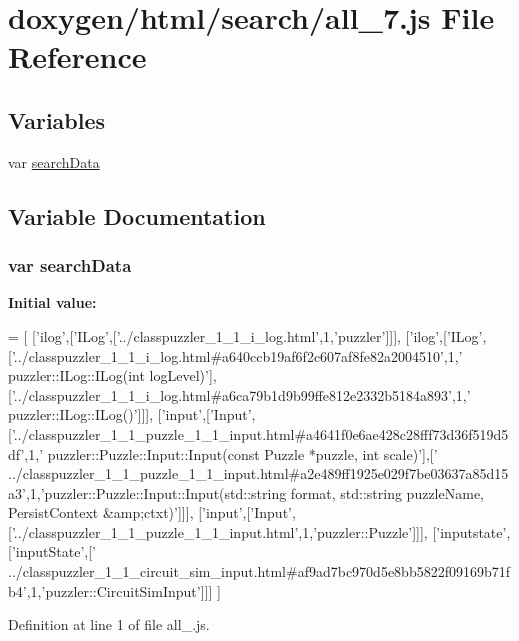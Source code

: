 \hypertarget{a00052}{}\section{doxygen/html/search/all\+\_\+7.js File Reference}
\label{a00052}
\subsection*{Variables}
\begin{DoxyCompactItemize}
\item 
var \hyperlink{a00052_ad01a7523f103d6242ef9b0451861231e}{search\+Data}
\end{DoxyCompactItemize}


\subsection{Variable Documentation}
\hypertarget{a00052_ad01a7523f103d6242ef9b0451861231e}{}
\subsubsection[{search\+Data}]{\setlength{\rightskip}{0pt plus 5cm}var search\+Data}\label{a00052_ad01a7523f103d6242ef9b0451861231e}
{\bfseries Initial value\+:}
\begin{DoxyCode}
=
[
  [\textcolor{stringliteral}{'ilog'},[\textcolor{stringliteral}{'ILog'},[\textcolor{stringliteral}{'../classpuzzler\_1\_1\_i\_log.html'},1,\textcolor{stringliteral}{'puzzler'}]]],
  [\textcolor{stringliteral}{'ilog'},[\textcolor{stringliteral}{'ILog'},[\textcolor{stringliteral}{'../classpuzzler\_1\_1\_i\_log.html#a640ccb19af6f2c607af8fe82a2004510'},1,\textcolor{stringliteral}{'
      puzzler::ILog::ILog(int logLevel)'}],[\textcolor{stringliteral}{'../classpuzzler\_1\_1\_i\_log.html#a6ca79b1d9b99ffe812e2332b5184a893'},1,\textcolor{stringliteral}{'
      puzzler::ILog::ILog()'}]]],
  [\textcolor{stringliteral}{'input'},[\textcolor{stringliteral}{'Input'},[\textcolor{stringliteral}{'../classpuzzler\_1\_1\_puzzle\_1\_1\_input.html#a4641f0e6ae428c28fff73d36f519d5df'},1,\textcolor{stringliteral}{'
      puzzler::Puzzle::Input::Input(const Puzzle *puzzle, int scale)'}],[\textcolor{stringliteral}{'
      ../classpuzzler\_1\_1\_puzzle\_1\_1\_input.html#a2e489ff1925e029f7be03637a85d15a3'},1,\textcolor{stringliteral}{'puzzler::Puzzle::Input::Input(std::string format, std::string puzzleName,
       PersistContext &amp;ctxt)'}]]],
  [\textcolor{stringliteral}{'input'},[\textcolor{stringliteral}{'Input'},[\textcolor{stringliteral}{'../classpuzzler\_1\_1\_puzzle\_1\_1\_input.html'},1,\textcolor{stringliteral}{'puzzler::Puzzle'}]]],
  [\textcolor{stringliteral}{'inputstate'},[\textcolor{stringliteral}{'inputState'},[\textcolor{stringliteral}{'
      ../classpuzzler\_1\_1\_circuit\_sim\_input.html#af9ad7bc970d5e8bb5822f09169b71fb4'},1,\textcolor{stringliteral}{'puzzler::CircuitSimInput'}]]]
]
\end{DoxyCode}


Definition at line 1 of file all\+\_.\+js.

